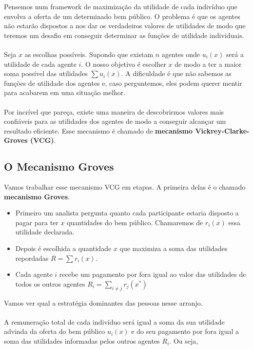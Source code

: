 \documentclass[a4paper,11pt,oneside]{book}
\theoremstyle{definition}
\theoremstyle{break}
\begin{document}
Pensemos num framework de maximização da utilidade de cada indivíduo que envolva a oferta de um determinado bem público. O problema é que os agentes não estarão dispostos a nos dar os verdadeiros valores de utilidades de modo que teremos um desafio em conseguir determinar as funções de utilidade individuais.
\\~\\
Seja $x$ as escolhas possíveis. Supondo que existam $n$ agentes onde $u_i(x)$ será a utilidade de cada agente $i$. O nosso objetivo é escolher $x$ de modo a ter a maior soma possível das utilidades $\sum u_i(x)$. A dificuldade é que não sabemos as funções de utilidade dos agentes e, caso perguntemos, eles podem querer mentir para acabarem em uma situação melhor.
\\~\\
Por incrível que pareça, existe uma maneira de descobrirmos valores mais confiáveis para as utilidades dos agentes de modo a conseguir alcançar um resultado eficiente. Esse mecanismo é chamado de \textbf{mecanismo Vickrey-Clarke-Groves (VCG)}. 

\subsection{O Mecanismo Groves}

Vamos trabalhar esse mecanismo VCG em etapas. A primeira delas é o chamado \textbf{mecanismo Groves}.

\begin{itemize}
	\item Primeiro um analista pergunta quanto cada participante estaria disposto a pagar para ter $x$ quantidades do bem público. Chamaremos de $r_i(x)$ essa utilidade declarada.
	\item Depois é escolhida a quantidade $x$ que maximiza a soma das utilidades repordadas $R = \sum r_i(x)$.
	\item Cada agente $i$ recebe um pagamento por fora igual ao valor das utilidades de todos os outros agentes $R_i = \sum_{i \neq j} r_j(x^*)$
\end{itemize}

Vamos ver qual a estratégia dominantes das pessoas nesse arranjo.
\\~\\
A remuneração total de cada indivíduo será igual a soma da sua utilidade advinda da oferta do bem público $u_i(x)$ e do seu pagamento por fora igual a soma das utilidades informadas pelos outros agentes $R_i$. Ou seja,
\end{document}
